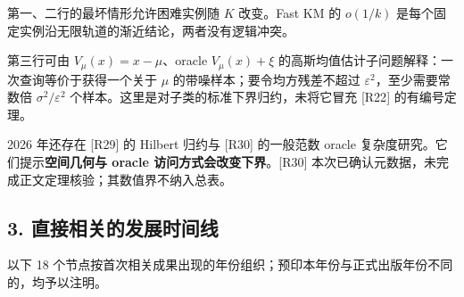 \documentclass[
  chinese,
  10pt,
  a4paper,
]{article}
\begin{document}
第一、二行的最坏情形允许困难实例随 \(K\) 改变。Fast KM 的 \(o(1/k)\)
是每个固定实例沿无限轨道的渐近结论，两者没有逻辑冲突。

第三行可由 \(V_\mu(x)=x-\mu\)、oracle \(V_\mu(x)+\xi\)
的高斯均值估计子问题解释：一次查询等价于获得一个关于 \(\mu\)
的带噪样本；要令均方残差不超过 \(\varepsilon^2\)，至少需要常数倍
\(\sigma^2/\varepsilon^2\)
个样本。这里是对子类的标准下界归约，未将它冒充 {[}R22{]} 的有编号定理。

2026 年还存在 {[}R29{]} 的 Hilbert 归约与 {[}R30{]} 的一般范数 oracle
复杂度研究。它们提示\textbf{空间几何与 oracle
访问方式会改变下界}。{[}R30{]}
本次已确认元数据，未完成正文定理核验；其数值界不纳入总表。

\subsection{3.
直接相关的发展时间线}\label{ux76f4ux63a5ux76f8ux5173ux7684ux53d1ux5c55ux65f6ux95f4ux7ebf}

以下 18
个节点按首次相关成果出现的年份组织；预印本年份与正式出版年份不同的，均予以注明。
\end{document}
